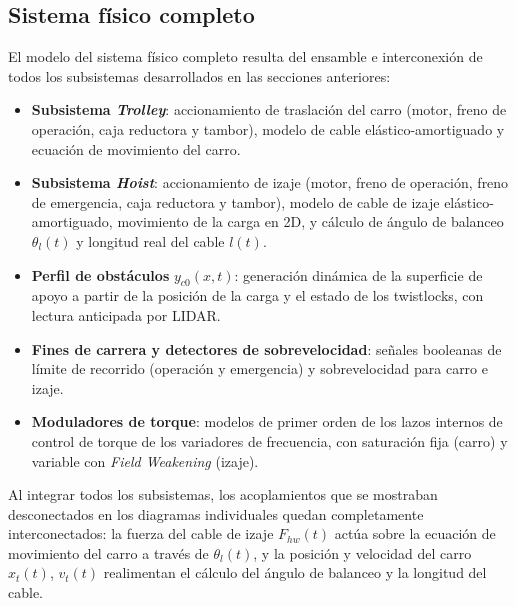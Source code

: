 \documentclass[12pt, a4paper]{article}
\begin{document}
\subsection{Sistema físico completo}
\label{sec:sistema-completo}

El modelo del sistema físico completo resulta del ensamble e interconexión de todos los
subsistemas desarrollados en las secciones anteriores:

\begin{itemize}
    \item \textbf{Subsistema \textit{Trolley}}: accionamiento de traslación del carro
    (motor, freno de operación, caja reductora y tambor), modelo de cable
    elástico-amortiguado y ecuación de movimiento del carro.

    \item \textbf{Subsistema \textit{Hoist}}: accionamiento de izaje (motor, freno de
    operación, freno de emergencia, caja reductora y tambor), modelo de cable de izaje
    elástico-amortiguado, movimiento de la carga en 2D, y cálculo de ángulo de balanceo
    $\theta_l(t)$ y longitud real del cable $l(t)$.

    \item \textbf{Perfil de obstáculos} $y_{c0}(x,t)$: generación dinámica de la
    superficie de apoyo a partir de la posición de la carga y el estado de los
    twistlocks, con lectura anticipada por LIDAR.

    \item \textbf{Fines de carrera y detectores de sobrevelocidad}: señales booleanas
    de límite de recorrido (operación y emergencia) y sobrevelocidad para carro e izaje.

    \item \textbf{Moduladores de torque}: modelos de primer orden de los lazos internos
    de control de torque de los variadores de frecuencia, con saturación fija (carro) y
    variable con \textit{Field Weakening} (izaje).
\end{itemize}

Al integrar todos los subsistemas, los acoplamientos que se mostraban desconectados en
los diagramas individuales quedan completamente interconectados: la fuerza del cable de
izaje $F_{hw}(t)$ actúa sobre la ecuación de movimiento del carro a través de
$\theta_l(t)$, y la posición y velocidad del carro $x_t(t)$, $v_t(t)$ realimentan
el cálculo del ángulo de balanceo y la longitud del cable.
\end{document}
